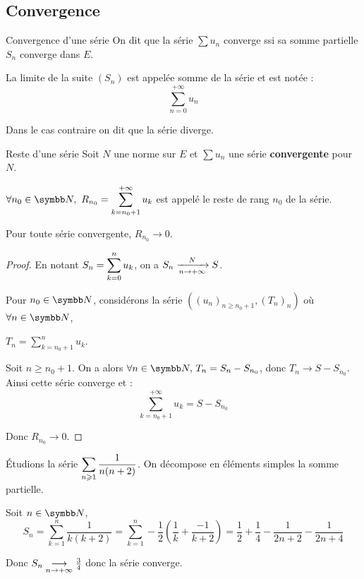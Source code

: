 \subsection{Convergence}

\begin{definition}{Convergence d'une série}{}
    On dit que la série $\sum u_n$ converge ssi sa somme partielle $S_n$ converge 
    dans $E$. 

    La limite de la suite $(S_n)$ est appelée somme de la série et est notée :
    \[\sum_{n=0}^{+\infty} u_n\]

    Dans le cas contraire on dit que la série diverge.
\end{definition}

\begin{definition}{Reste d'une série}{}
    Soit $N$ une norme sur $E$ et $\sum u_n$ une série \textbf{convergente} pour $N$.

    $\ds \forall n_0 \in \N,~R_{n_0} = \sum_{k = n_0 + 1}^{+\infty} u_k$
    est appelé le reste de rang $n_0$ de la série. 
\end{definition}

\begin{proposition}{}{}
    Pour toute série convergente, $R_{n_0} \to 0$.
\end{proposition}

\begin{proof}
    En notant $\ds S_n = \sum_{k=0}^n u_k$, on a $S_n \limitnorme{N}{n}{+ \infty} S$.

    Pour $n_0 \in \N$, considérons la série $((u_n)_{n \geqslant n_0 + 1}, (T_n)_n)$ où
    $\displaystyle \forall n \in \N$, 
    
    $\displaystyle T_n = \sum_{k = n_0 + 1}^{n} u_k$. 

    Soit $n \geqslant n_0 + 1$. On a alors $\forall n \in \N, \, T_n = S_n - S_{n_0}$, 
    donc $T_n \to S - S_{n_0}$. Ainsi cette série converge et :
    \[\sum_{k = n_0 + 1}^{+\infty} u_k = S - S_{n_0}\]
    
    Donc $R_{n_0} \to 0$.
\end{proof}

\begin{exemple}
    Étudions la série $\ds\sum_{n \geqslant 1} \frac 1 {n(n+2)}$. On décompose en éléments simples la somme partielle.

    Soit $n \in \N$,
    \[S_n = \sum_{k=1}^n \frac 1 {k(k+2)} = \sum_{k=1}^n - \frac 1 2 \left( \frac 1 k + \frac {-1} {k+2}\right) = \frac 1 2 + \frac 1 4 - \frac 1 {2n+2} - \frac 1 {2n+4}\]

    Donc $S_n \limit{n}{+\infty} \frac 3 4$ donc la série converge.
\end{exemple}


